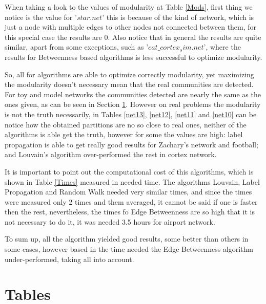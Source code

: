 \documentclass[12pt,a4paper,oneside]{article}
\numberwithin{equation}{section}
\numberwithin{equation}{section}
\theoremstyle{definition}
\begin{document}
When taking a look to the values of modularity at Table \ref{Mods}, first thing we notice is the value for '$star.net$' this is because of the kind of network, which is just a node with multiple edges to other nodes not connected between them, for this special case the results are 0. Also notice that in general the results are quite similar, apart from some exceptions, such as '$cat\_cortex_sim.net$', where the results for Betweenness based algorithms is less successful to optimize modularity.

So, all for algorithms are able to optimize correctly modularity, yet maximizing the modularity doesn't necessary mean that the real communities are detected. For toy and model networks the communities detected are nearly the same as the ones given, as can be seen in Section \ref{tables}. However on real problems the modularity is not the truth necessarily, in Tables \ref{net13}, \ref{net12}, \ref{net11} and \ref{net10} can be notice how the obtained partitions are no so close to real ones, neither of the algorithms is able get the truth, however for some the values are high: label propagation is able to get really good results for Zachary's network and football; and  Louvain's algorithm over-performed the rest in cortex network.

It is important to point out the computational cost of this algorithms, which is shown in Table \ref{Times} measured in needed time. The algorithms Louvain, Label Propagation and Random Walk needed very similar times, and since the times were measured only 2 times and them averaged, it cannot be said if one is faster then the rest, nevertheless, the times fo Edge Betweenness are so high that it is not necessary to do it, it was needed 3.5 hours for airport network. 

To sum up, all the algorithm yielded good results, some better than others in some cases, however based in the time needed the Edge Betweenness algorithm under-performed, taking all into account.  




\section{Tables}\label{tables}
\end{document}
